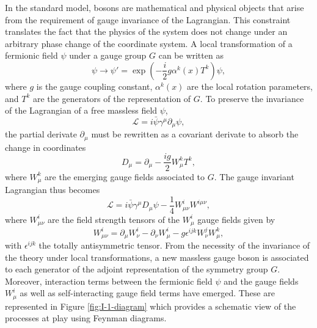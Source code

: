     In the standard model, bosons are mathematical and physical objects that arise from the requirement of gauge invariance of the Lagrangian. This constraint translates the fact that the physics of the system does not change under an arbitrary phase change of the coordinate system. A local transformation of a fermionic field $ \psi $ under a gauge group $ G $  can be written as
    \begin{equation}
      \psi \rightarrow \psi' = \exp\left(- \frac{i}{2} g \alpha^k(x) T^k \right) \psi ,
    \end{equation}
    where $ g $ is the gauge coupling constant, $ \alpha^k(x) $ are the local rotation parameters, and $ T^k $ are the generators of the representation of $ G $. To preserve the invariance of the Lagrangian of a free massless field $ \psi $,
    \begin{equation}
      \mathcal{L} = i \bar{\psi} \gamma^\mu \partial_\mu \psi ,
    \end{equation}
    the partial derivate $ \partial_\mu $ must be rewritten as a covariant derivate to absorb the change in coordinates
    \begin{equation}
      D_\mu = \partial_\mu - \frac{i g}{2} W^k_\mu T^k ,
    \end{equation}
    where $ W^k_\mu $ are the emerging gauge fields associated to $ G $. The gauge invariant Lagrangian thus becomes
    \begin{equation}
      \mathcal{L} = i \bar{\psi} \gamma^\mu D_\mu \psi - \frac{1}{4} W^i_{\mu \nu} W^{i \mu \nu} ,
    \end{equation}
    where $ W^i_{\mu \nu} $ are the field strength tensors of the $ W^i_\mu $ gauge fields given by
    \begin{equation}
      W^i_{\mu \nu} = \partial_\mu W^i_\nu - \partial_\nu W^i_\mu - g \epsilon^{ijk} W^j_\nu W^k_\mu ,
    \end{equation}
    with $ \epsilon^{ijk} $ the totally antisymmetric tensor. From the necessity of the invariance of the theory under local transformations, a new massless gauge boson is associated to each generator of the adjoint representation of the symmetry group $ G $. Moreover, interaction terms between the fermionic field $ \psi $ and the gauge fields $ W^i_\mu $ as well as self-interacting gauge field terms have emerged. These are represented in Figure \ref{fig:I-1-diagram} which provides a schematic view of the processes at play using Feynman diagrams.

